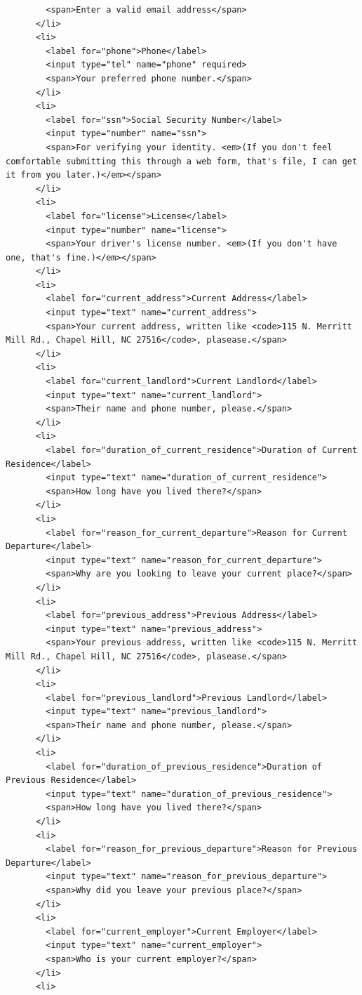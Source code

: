 \documentclass[11pt]{article}
\begin{document}
\begin{enumerate}
\begin{verbatim}
	    <span>Enter a valid email address</span>
	  </li>
	  <li>
	    <label for="phone">Phone</label>
	    <input type="tel" name="phone" required>
	    <span>Your preferred phone number.</span>
	  </li>
	  <li>
	    <label for="ssn">Social Security Number</label>
	    <input type="number" name="ssn">
	    <span>For verifying your identity. <em>(If you don't feel comfortable submitting this through a web form, that's file, I can get it from you later.)</em></span>
	  </li>
	  <li>
	    <label for="license">License</label>
	    <input type="number" name="license">
	    <span>Your driver's license number. <em>(If you don't have one, that's fine.)</em></span>
	  </li>
	  <li>
	    <label for="current_address">Current Address</label>
	    <input type="text" name="current_address">
	    <span>Your current address, written like <code>115 N. Merritt Mill Rd., Chapel Hill, NC 27516</code>, plasease.</span>
	  </li>
	  <li>
	    <label for="current_landlord">Current Landlord</label>
	    <input type="text" name="current_landlord">
	    <span>Their name and phone number, please.</span>
	  </li>
	  <li>
	    <label for="duration_of_current_residence">Duration of Current Residence</label>
	    <input type="text" name="duration_of_current_residence">
	    <span>How long have you lived there?</span>
	  </li>
	  <li>
	    <label for="reason_for_current_departure">Reason for Current Departure</label>
	    <input type="text" name="reason_for_current_departure">
	    <span>Why are you looking to leave your current place?</span>
	  </li>
	  <li>
	    <label for="previous_address">Previous Address</label>
	    <input type="text" name="previous_address">
	    <span>Your previous address, written like <code>115 N. Merritt Mill Rd., Chapel Hill, NC 27516</code>, plasease.</span>
	  </li>
	  <li>
	    <label for="previous_landlord">Previous Landlord</label>
	    <input type="text" name="previous_landlord">
	    <span>Their name and phone number, please.</span>
	  </li>
	  <li>
	    <label for="duration_of_previous_residence">Duration of Previous Residence</label>
	    <input type="text" name="duration_of_previous_residence">
	    <span>How long have you lived there?</span>
	  </li>
	  <li>
	    <label for="reason_for_previous_departure">Reason for Previous Departure</label>
	    <input type="text" name="reason_for_previous_departure">
	    <span>Why did you leave your previous place?</span>
	  </li>
	  <li>
	    <label for="current_employer">Current Employer</label>
	    <input type="text" name="current_employer">
	    <span>Who is your current employer?</span>
	  </li>
	  <li>

\end{verbatim}
\end{enumerate}
\end{document}
